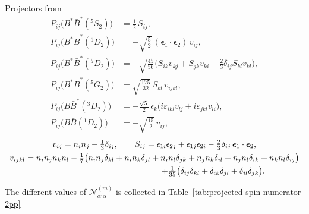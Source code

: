 \documentclass[aps,prl,showpacs,amsmath,onecolumn,superscriptaddress,floatfix,nofootinbib,notitlepage]{revtex4-2}
\newcommand{\be}{\begin{equation}}
\newcommand{\ee}{\end{equation}}
\newcommand{\BB}{B\bar B}
\newcommand{\BBst}{B\bar B^*}
\newcommand{\BstBst}{B^*\bar B^*}
\newcommand{\veps}{\bm\epsilon}
\begin{document}
Projectors from \cite{Baru:2019xnh}
\be
\begin{aligned}
	P_{ij}\big(\BstBst(^5S_2)\big) & =\tfrac12\,S_{ij},                                                                          \\
	P_{ij}\big(\BstBst(^1D_2)\big) & =-\sqrt{\tfrac52}\,(\veps_1\cdot\veps_2)\,v_{ij},                                           \\
	P_{ij}\big(\BstBst(^5D_2)\big) & =-\sqrt{\tfrac{45}{56}}\Big(S_{ik}v_{kj}+S_{jk}v_{ki}-\tfrac23\delta_{ij}S_{kl}v_{kl}\Big), \\
	P_{ij}\big(\BstBst(^5G_2)\big) & =\sqrt{\tfrac{175}{32}}\,S_{kl}\,v_{ijkl},                                                  \\
	P_{ij}\big(\BBst(^3D_2)\big)   & =-\tfrac{\sqrt5}{2}\,\epsilon_k\big(i\varepsilon_{ikl}v_{lj}+i\varepsilon_{jkl}v_{li}\big), \\
	P_{ij}\big(\BB(^1D_2)\big)     & =-\sqrt{\tfrac{15}{2}}\,v_{ij},
\end{aligned}
\ee
\begin{gather}
	v_{ij}=n_in_j-\tfrac13\delta_{ij},\qquad
	S_{ij}=\epsilon_{1i}\epsilon_{2j}+\epsilon_{1j}\epsilon_{2i}-\tfrac23\delta_{ij}\,\veps_1\cdot\veps_2,\notag\\
	v_{ijkl}=n_in_jn_kn_l-\tfrac17\big(n_in_j\delta_{kl}+n_in_k\delta_{jl}+n_in_l\delta_{jk}+n_jn_k\delta_{il}+n_jn_l\delta_{ik}+n_kn_l\delta_{ij}\big)\notag\\
	\hspace{5cm}+\tfrac1{35}\big(\delta_{ij}\delta_{kl}+\delta_{ik}\delta_{jl}+\delta_{il}\delta_{jk}\big).
\end{gather}

The different values of $\mathcal{N}_{\alpha'\alpha}^{(m)}$ is collected in Table~\ref{tab:projected-spin-numerator-2pp}
\end{document}
